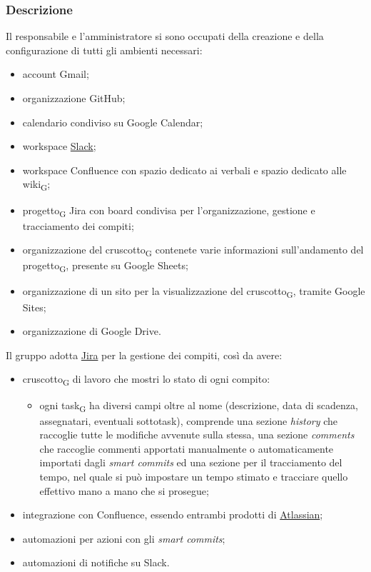     \subsubsection{Descrizione}
    Il responsabile e l'amministratore si sono occupati della creazione e della configurazione di tutti gli ambienti necessari:
    \begin{itemize}
        \item account Gmail;
        \item organizzazione GitHub;
        \item calendario condiviso su Google Calendar;
        \item workspace \href{https://slack.com/intl/en-it/about}{Slack};
        \item workspace Confluence con spazio dedicato ai verbali e spazio dedicato alle wiki\textsubscript{G};
        \item progetto\textsubscript{G} Jira con board condivisa per l'organizzazione, gestione e tracciamento dei compiti;
        \item organizzazione del cruscotto\textsubscript{G} contenete varie informazioni sull'andamento del progetto\textsubscript{G}, presente su Google Sheets;
        \item organizzazione di un sito per la visualizzazione del cruscotto\textsubscript{G}, tramite Google Sites;
        \item organizzazione di Google Drive.
    \end{itemize}
        Il gruppo adotta \href{https://www.atlassian.com/software/jira}{Jira} per la gestione dei compiti, così da avere:
        \begin{itemize}
            \item cruscotto\textsubscript{G} di lavoro che mostri lo stato di ogni compito:
            \begin{itemize}
                \item ogni task\textsubscript{G} ha diversi campi oltre al nome (descrizione, data di scadenza, assegnatari, eventuali sottotask), comprende una sezione \textit{history} che raccoglie tutte le modifiche avvenute sulla stessa, una sezione \textit{comments} che raccoglie commenti apportati manualmente o automaticamente importati dagli \textit{smart commits} ed una sezione per il tracciamento del tempo, nel quale si può impostare un tempo stimato e tracciare quello effettivo mano a mano che si prosegue;
            \end{itemize}

            \item integrazione con Confluence, essendo entrambi prodotti di \href{https://www.atlassian.com/}{Atlassian};
            \item automazioni per azioni con gli \textit{smart commits};
            \item automazioni di notifiche su Slack.
        \end{itemize}

